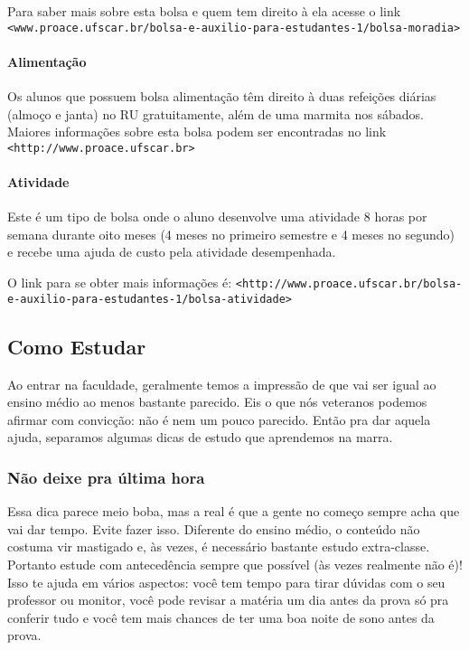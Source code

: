 Para saber mais sobre esta bolsa e quem tem direito à ela acesse o link \newline \texttt{<www.proace.ufscar.br/bolsa-e-auxilio-para-estudantes-1/bolsa-moradia>}

\paragraph{Alimentação}
Os alunos que possuem bolsa alimentação têm direito à duas refeições diárias (almoço e janta) no RU gratuitamente, além de uma marmita nos sábados.
\newline \newline Maiores informações sobre esta bolsa podem ser encontradas no link \texttt{<http://www.proace.ufscar.br>}

\paragraph{Atividade}
Este é um tipo de bolsa onde o aluno desenvolve uma atividade 8 horas por semana durante oito meses (4 meses no primeiro semestre e 4 meses no segundo) e recebe uma ajuda de custo pela atividade desempenhada.

O link para se obter mais informações é:
\newline \texttt{<http://www.proace.ufscar.br/bolsa-e-auxilio-para-estudantes-1/bolsa-atividade>}

\subsection{Como Estudar}
Ao entrar na faculdade, geralmente temos a impressão de que vai ser igual ao ensino médio ao menos bastante parecido. Eis o que nós veteranos podemos afirmar com convicção: não é nem um pouco parecido. Então pra dar aquela ajuda, separamos algumas dicas de estudo que aprendemos na marra.

\subsubsection{Não deixe pra última hora}
Essa dica parece meio boba, mas a real é que a gente no começo sempre acha que vai dar tempo. Evite fazer isso. Diferente do ensino médio, o conteúdo não costuma vir mastigado e, às vezes, é necessário bastante estudo extra-classe. Portanto estude com antecedência sempre que possível (às vezes realmente não é)! Isso te ajuda em vários aspectos: você tem tempo para tirar dúvidas com o seu professor ou monitor, você pode revisar a matéria um dia antes da prova só pra conferir tudo e você tem mais chances de ter uma boa noite de sono antes da prova.

